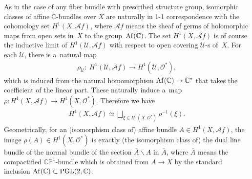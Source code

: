 \documentclass[11pt]{article}
\numberwithin{equation}{section}
\begin{document}
As in the case of any f\/iber bundle with prescribed structure group, isomorphic classes of af\/f\/ine
$\mathbb{C}$-bundles over $X$ are naturally in 1-1 correspondence with the cohomology set $H^1(X, \mathscr {A}f)$, where
$\mathscr {A}f$ means the sheaf of germs of holomorphic maps from open sets in~$X$ to the group~${\rm{Af}}(\mathbb{C})$.
The set $H^1(X, \mathscr {A}f)$ is of course the inductive limit of $H^1(\mathscr U,\mathscr Af)$ with respect to open
covering $\mathscr U$-s of~$X$.
For each $\mathscr U$, there is a~natural map
\begin{gather*}
\rho_{\mathscr U}: \ H^1(\mathscr U,{\mathscr A}f)
 \longrightarrow
H^1(\mathscr U,\mathscr O^*),
\end{gather*}
which is induced from the natural homomorphism $ {\rm {Af}}(\mathbb{C})\to \mathbb{C}^*$ that takes the coef\/f\/icient
of the linear part.
These naturally induce a~map $\rho:H^1(X, \mathscr Af)\to H^1(X,\mathscr O^*)$.
Therefore we have
\begin{gather}
\label{star1}
H^1(X,\mathscr Af) \simeq \bigsqcup_{\xi \in H^1(X,\mathscr O^*)}\rho^{-1}(\xi).
\end{gather}
Geometrically, for an (isomorphism class of) af\/f\/ine bundle $A\in H^1(X,\mathscr Af)$, the image $\rho(A)\in
H^1(X,\mathscr O^*)$ is exactly (the isomorphism class of) the dual line bundle of the normal bundle of the section
$\overline A \backslash A$ in $\overline A$, where $\overline A$ means the compactif\/ied $\mathbb{CP}^1$-bundle which
is obtained from $A\to X$ by the standard inclusion ${\rm Af}(\mathbb{C})\subset\mathrm{PGL}(2,\mathbb{C})$.
\end{document}
